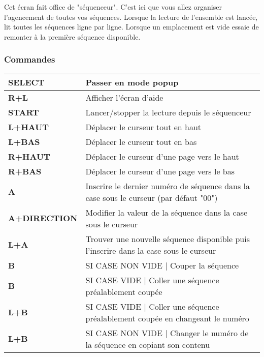 Cet écran fait office de "séquenceur".
C'est ici que vous allez organiser l'agencement de toutes vos séquences.
Lorsque la lecture de l'ensemble est lancée, \FAT lit toutes les séquences ligne par ligne.
Lorsque un emplacement est vide \FAT essaie de remonter à la première séquence disponible.


\subsubsection{Commandes}

\tablelasttail{\hline}
\begin{supertabular}{|l|p{11cm}|}
\hline
    {\bf SELECT} & Passer en mode popup \\
    \hline
    {\bf R+L} & Afficher l'écran d'aide \\
    \hline
    {\bf START} & Lancer/stopper la lecture depuis le séquenceur \\
    \hline
    {\bf L+HAUT} & Déplacer le curseur tout en haut \\
    \hline
    {\bf L+BAS} & Déplacer le curseur tout en bas \\
    \hline
    {\bf R+HAUT} & Déplacer le curseur d'une page vers le haut \\
    \hline
    {\bf R+BAS} & Déplacer le curseur d'une page vers le bas \\
    \hline
    {\bf A} & Inscrire le dernier numéro de séquence dans la case sous le curseur (par défaut "00") \\
    \hline
    {\bf A+DIRECTION} & Modifier la valeur de la séquence dans la case sous le curseur \\
    \hline
    {\bf L+A} & Trouver une nouvelle séquence disponible puis l'inscrire dans la case sous le curseur \\
    \hline
    {\bf B} & SI CASE NON VIDE | Couper la séquence \\
    \hline
    {\bf B} & SI CASE VIDE | Coller une séquence préalablement coupée \\
    \hline
    {\bf L+B} & SI CASE VIDE | Coller une séquence préalablement coupée en changeant le numéro \\
    \hline
    {\bf L+B} & SI CASE NON VIDE | Changer le numéro de la séquence en copiant son contenu \\
\hline
\end{supertabular}
